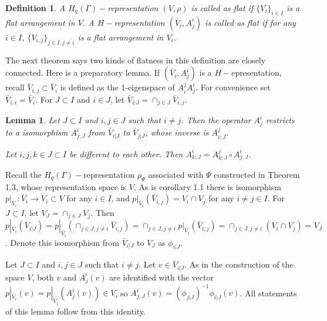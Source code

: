 \def\CTEXPreproc{Created by ctex v0.2.12, don't edit!}\documentclass[11pt]{article}
\newtheorem{lem}{Lemma}[section]
\newtheorem{defi}{Definition}[section]
\begin{document}
\begin{defi}
A $H_q (\Gamma )-$representation $(V, \rho )$ is called as flat if $\{  V_i  \}_{i\in I }$ is a flat arrangement in $V$.
A $H-$representation $(  \bar{V}_i  , A^i _j  )$ is called as flat if for any $i\in I$, $\{  V_{i,j }  \}_{j\in I , j\neq i}$
 is a flat arrangement in $V_i$.
\end{defi}


The next theorem says two kinds of flatness in this definition are closely connected. Here is a preparatory lemma. If $(\bar{V}_i , A^i _j )$ is a $H-$epresentation, recall $\bar{V}_{i,j}\subset \bar{V}_i$ is defined as the 1-eigenspace of $A^j _i A^i _j$. For convenience set $\bar{V}_{i,i}=\bar{V}_i$.
 For $J\subset I$ and $i\in J$, let $\bar{V}_{i|J}=\cap _{j\in J} \bar{V}_{i,j}$.

\begin{lem}
Let $J\subset I$ and $i,j \in J$ such that $i\neq j$. Then the operator $A^i _j $ restricts to a isomorphism  $A^i _{j;J}$  from
$\bar{V}_{i|J }  $ to $\bar{V}_{j| J }$,  whose inverse  is  $A^j _{i;J}$.

Let $i,j,k \in J\subset I$ be different to each other.  Then
$ A^i _{k;  J } = A^j _{k; J } \circ   A^i _{j;  J } $.


\end{lem}

\begin{pf}
Recall the $H_q (\Gamma)-$representation $\rho_{\Psi}$ associated with $\Psi$ constructed in Theorem 1.3, whose representation space is $V$. As is corollary 1.1 there is isomorphism $p|_{\bar{V}_i } : \bar{V}_i \rightarrow V_i \subset V $ for any $i\in I$, and
$p|_{\bar{V}_i } (  \bar{V}_{i,j} )= V_i \cap V_j$ for any $i\neq j \in I$.  For $J\subset I$, let $V_J = \cap_{j\in J} V_j $. Then
 $ p|_{\bar{V}_i } ( \bar{V}_{i |J}  )=
 p|_{\bar{V}_i } (\cap _{j\in J , j\neq i} \bar{V}_{i,j})= \cap _{j\in J , j\neq i} p|_{\bar{V}_i } (\bar{V}_{i,j}) =
 \cap _{j\in J , j\neq i} ( V_i \cap V_j ) = V_J $. Denote this isomorphism from $\bar{V}_{i|J} $ to $V_J$ as $\phi_{i|J}$.

Let $J\subset I$ and $i,j \in J$ such that $i\neq j$. Let $v\in \bar{V}_{i|J}$. As in the construction of the space $V$,  both
$v$ and $A^i _j (v)$ are identified with the vector $ p|_{\bar{V}_i } (v) =p|_{\bar{V}_j }(  A^i _j (v) ) \in V $, so
$ A^i _{j;J} (v) = ( \phi_{j|J} )^{-1} \phi_{i|J} (v)  $. All statements of this lemma follow from this identity.


\end{pf}
\end{document}
